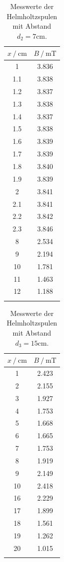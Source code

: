 \begin{table}
\centering
\caption{Messwerte der Helmholtzspulen mit Abstand $d_2=7\si{\centi\metre}$.}
\begin{tabular}{cc}
\toprule
$x \:/\: \si{\centi\metre}$ & $B \:/\: \si{\milli\tesla}$ \\
\midrule
1& 3.836  \\
1.1& 3.838\\
1.2& 3.837\\
1.3& 3.838\\
1.4& 3.837\\
1.5& 3.838\\
1.6& 3.839\\
1.7& 3.839\\
1.8& 3.840\\
1.9& 3.839\\
2& 3.841\\
2.1& 3.841\\
2.2& 3.842\\
2.3& 3.846\\
8& 2.534\\
9& 2.194\\
10& 1.781\\
11& 1.463\\
12& 1.188\\
\bottomrule
\label{tab:helm2}
\end{tabular}
\end{table}


\begin{table}
\centering
\caption{Messwerte der Helmholtzspulen mit Abstand $d_3=15\si{\centi\metre}$.}
\begin{tabular}{cc}
\toprule
$x \:/\: \si{\centi\metre}$ & $B \:/\: \si{\milli\tesla}$ \\
\midrule
1& 2.423  \\
2& 2.155\\
3& 1.927\\
4& 1.753\\
5& 1.668\\
6& 1.665\\
7& 1.753\\
8& 1.919\\
9& 2.149\\
10& 2.418\\
16& 2.229\\
17& 1.899\\
18& 1.561\\
19& 1.262\\
20& 1.015\\
\bottomrule
\label{tab:helm3}
\end{tabular}
\end{table}


